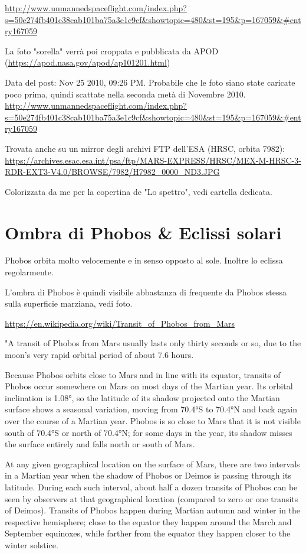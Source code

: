 \documentclass[a4paper,10pt,openany,oneside]{memoir}
\begin{document}
\url{http://www.unmannedspaceflight.com/index.php?s=50e274fb401c38cab101ba75a3e1c9cf&showtopic=480&st=195&p=167059&#entry167059}


La foto "sorella" verrà poi croppata e pubblicata da APOD (\url{https://apod.nasa.gov/apod/ap101201.html})

Data del post:  Nov 25 2010, 09:26 PM. Probabile che le foto siano state caricate poco prima, quindi scattate nella seconda metà di Novembre 2010. \url{http://www.unmannedspaceflight.com/index.php?s=50e274fb401c38cab101ba75a3e1c9cf&showtopic=480&st=195&p=167059&#entry167059}

Trovata anche su un mirror degli archivi FTP dell'ESA (HRSC, orbita 7982):
\url{https://archives.esac.esa.int/psa/ftp/MARS-EXPRESS/HRSC/MEX-M-HRSC-3-RDR-EXT3-V4.0/BROWSE/7982/H7982_0000_ND3.JPG}

Colorizzata da me per la copertina de "Lo spettro", vedi cartella dedicata.



\section{Ombra di Phobos \& Eclissi solari}

Phobos orbita molto velocemente e in senso opposto al sole. Inoltre lo eclissa regolarmente.

L'ombra di Phobos è quindi visibile abbastanza di frequente da Phobos stessa sulla superficie marziana, vedi foto.

\url{https://en.wikipedia.org/wiki/Transit_of_Phobos_from_Mars}

"A transit of Phobos from Mars usually lasts only thirty seconds or so, due to the moon's very rapid orbital period of about 7.6 hours.

Because Phobos orbits close to Mars and in line with its equator, transits of Phobos occur somewhere on Mars on most days of the Martian year. Its orbital inclination is 1.08°, so the latitude of its shadow projected onto the Martian surface shows a seasonal variation, moving from 70.4°S to 70.4°N and back again over the course of a Martian year. Phobos is so close to Mars that it is not visible south of 70.4°S or north of 70.4°N; for some days in the year, its shadow misses the surface entirely and falls north or south of Mars.

At any given geographical location on the surface of Mars, there are two intervals in a Martian year when the shadow of Phobos or Deimos is passing through its latitude. During each such interval, about half a dozen transits of Phobos can be seen by observers at that geographical location (compared to zero or one transits of Deimos). Transits of Phobos happen during Martian autumn and winter in the respective hemisphere; close to the equator they happen around the March and September equinoxes, while farther from the equator they happen closer to the winter solstice.
\end{document}

